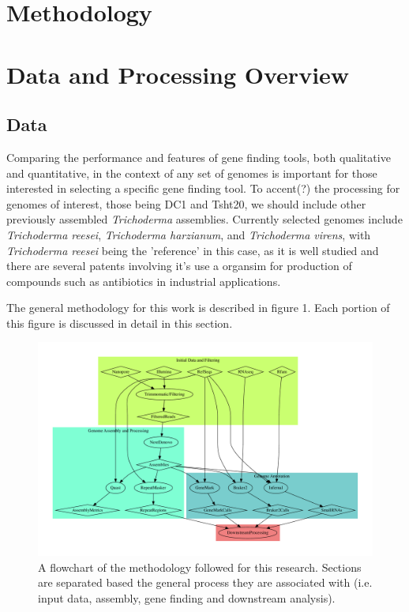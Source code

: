 \section{Methodology}

\section{Data and Processing Overview}

\subsection{Data}

Comparing the performance and features of gene finding tools, both
qualitative and quantitative, in the context of any set of genomes is
important for those interested in selecting a specific gene finding
tool. To accent(?) the processing for genomes of interest, those being
DC1 and Tsht20, we should include other previously assembled
\textit{Trichoderma} assemblies. Currently selected genomes include
\textit{Trichoderma reesei}, \textit{Trichoderma harzianum}, and
\textit{Trichoderma virens}, with \textit{Trichoderma reesei} being
the 'reference' in this case, as it is well studied and there are
several patents involving it's use a organsim for production of
compounds such as antibiotics in industrial applications.

The general methodology for this work is described in figure 1. Each
portion of this figure is discussed in detail in this section.

\begin{figure}
  \includegraphics[width=\textwidth]{./figures/data-flowchart.pdf}
  \caption{A flowchart of the methodology followed for this
    research. Sections are separated based the general process they
    are associated with (i.e. input data, assembly, gene finding and
    downstream analysis).}
\end{figure}

